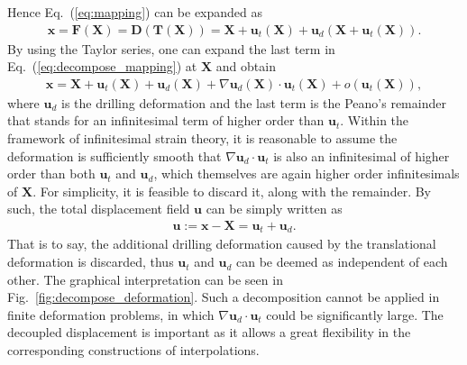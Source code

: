 \documentclass[3p,sort&compress,review,11pt]{elsarticle}
\newcommand*{\figref}[1]{Fig.~\ref{#1}}
\newcommand*{\eqsref}[1]{Eq.~(\ref{#1})}
\begin{document}
Hence \eqsref{eq:mapping} can be expanded as
\begin{gather}\label{eq:decompose_mapping}
\mathbold{x}=\mathbold{F}\left(\mathbold{X}\right)=\mathbold{D}\left(\mathbold{T}\left(\mathbold{X}\right)\right)=\mathbold{X}+\mathbold{u}_t\left(\mathbold{X}\right)+\mathbold{u}_d\left(\mathbold{X}+\mathbold{u}_t\left(\mathbold{X}\right)\right).
\end{gather}
By using the Taylor series, one can expand the last term in \eqsref{eq:decompose_mapping} at $\mathbold{X}$ and obtain
\begin{gather*}
\mathbold{x}=\mathbold{X}+\mathbold{u}_t\left(\mathbold{X}\right)+\mathbold{u}_d\left(\mathbold{X}\right)+\nabla\mathbold{u}_d\left(\mathbold{X}\right)\cdot\mathbold{u}_t\left(\mathbold{X}\right)+o\left(\mathbold{u}_t\left(\mathbold{X}\right)\right),
\end{gather*}
where $\mathbold{u}_d$ is the drilling deformation and the last term is the Peano's remainder that stands for an infinitesimal term of higher order than $\mathbold{u}_t$. Within the framework of infinitesimal strain theory, it is reasonable to assume the deformation is sufficiently smooth that $\nabla\mathbold{u}_d\cdot\mathbold{u}_t$ is also an infinitesimal of higher order than both $\mathbold{u}_t$ and $\mathbold{u}_d$, which themselves are again higher order infinitesimals of $\mathbold{X}$. For simplicity, it is feasible to discard it, along with the remainder. By such, the total displacement field $\mathbold{u}$ can be simply written as
\begin{gather}\label{eq:decompose_deformation}
\mathbold{u}:=\mathbold{x}-\mathbold{X}=\mathbold{u}_t+\mathbold{u}_d.
\end{gather}
That is to say, the additional drilling deformation caused by the translational deformation is discarded, thus $\mathbold{u}_t$ and $\mathbold{u}_d$ can be deemed as independent of each other. The graphical interpretation can be seen in \figref{fig:decompose_deformation}. Such a decomposition cannot be applied in finite deformation problems, in which $\nabla\mathbold{u}_d\cdot\mathbold{u}_t$ could be significantly large. The decoupled displacement is important as it allows a great flexibility in the corresponding constructions of interpolations.
\end{document}
